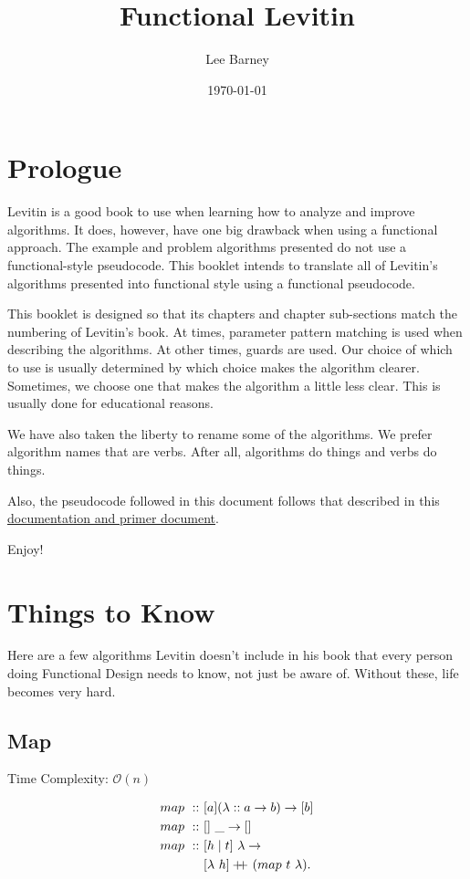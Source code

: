 \documentclass[a4paper,10pt]{book}
\title{Functional Levitin}
\author{Lee Barney}
\newcommand\doubleplus{+\kern-1.3ex+\kern0.8ex}
\begin{document}
\maketitle
\date{\today}
\frontmatter
\chapter{Prologue}
Levitin is a good book to use when learning how to analyze and improve algorithms. It does, however, have one big drawback when using a functional approach. The example and problem algorithms presented do not use a functional-style pseudocode. This booklet intends to translate all of Levitin's algorithms presented into functional style using a functional pseudocode.

This booklet is designed so that its chapters and chapter sub-sections match the numbering of Levitin's book. At times, parameter pattern matching is used when describing the algorithms. At other times, guards are used. Our choice of which to use is usually determined by which choice makes the algorithm clearer. Sometimes, we choose one that makes the algorithm a little less clear. This is usually done for educational reasons.

We have also taken the liberty to rename some of the algorithms. We prefer algorithm names that are verbs. After all, algorithms do things and verbs do things.

Also, the pseudocode followed in this document follows that described in this \href{https://byui-cse.github.io/cse382-course/pseudocode_primer.html}{documentation and primer document}.

Enjoy!
\chapter{Things to Know}

Here are a few algorithms Levitin doesn't include in his book that every person doing Functional Design needs to know, not just be aware of. Without these, life becomes very hard.

\section{Map}
Time Complexity: $\mathcal{O}(n)$

\begin{align*}
map\ ::\ &[a](\lambda::a\rightarrow b)\rightarrow[b]\\
map\ ::\ &[]\ \_\rightarrow []\\
map\ ::\ &[h\mid t]\  \lambda\rightarrow\\
&[\lambda\ h]\doubleplus(map\ t\ \lambda).
\end{align*}
\end{document}
